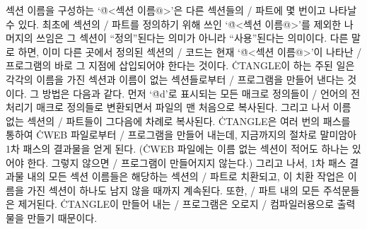 섹션 이름을 구성하는 `\.{@<섹션 이름@>}'은 다른 섹션들의 \CEE/ 파트에 몇 번이고 나타날 수
있다. 최초에 섹션의 \CEE/ 파트를 정의하기 위해 쓰인 `\.{@<섹션 이름@>}'를 제외한 나머지의
쓰임은 그 섹션이 ``정의''된다는 의미가 아니라 ``사용''된다는 의미이다. 다른 말로 하면,
이미 다른 곳에서 정의된 섹션의 \CEE/ 코드는 현재 `\.{@<섹션 이름@>}'이 나타난 \CEE/
프로그램의 바로 그 지점에 삽입되어야 한다는 것이다. \.{CTANGLE}이 하는 주된 일은 각각의
이름을 가진 섹션과 이름이 없는 섹션들로부터 \CEE/ 프로그램을 만들어 낸다는 것이다. 그 방법은
다음과 같다. 먼저 `\.{@d}'로 표시되는 모든 매크로 정의들이 \CEE/ 언어의 전처리기 매크로
정의들로 변환되면서 파일의 맨 처음으로 복사된다. 그리고 나서 이름 없는 섹션의 \CEE/ 파트들이
그다음에 차례로 복사된다. \.{CTANGLE}은 여러 번의 패스를 통하여 \.{CWEB} 파일로부터 \CEE/
프로그램을 만들어 내는데, 지금까지의 절차로 말미암아 1차 패스의 결과물을 얻게 된다.
(\.{CWEB} 파일에는 이름 없는 섹션이 적어도 하나는 있어야 한다. 그렇지 않으면 \CEE/
프로그램이 만들어지지 않는다.) 그리고 나서, 1차 패스 결과물 내의 모든 섹션 이름들은 해당하는
섹션의 \CEE/ 파트로 치환되고, 이 치환 작업은 이름을 가진 섹션이 하나도 남지 않을 때까지
계속된다. 또한, \CEE/ 파트 내의 모든 주석문들은 제거된다. \.{CTANGLE}이 만들어 내는
\CEE/ 프로그램은 오로지 \CEE/ 컴파일러용으로 출력물을 만들기 때문이다.

